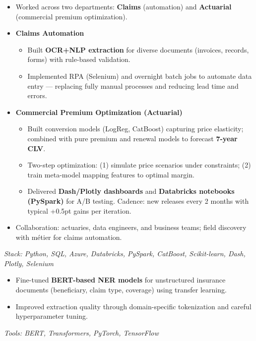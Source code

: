 \documentclass[10pt,a4paper]{altacv}
\begin{document}
\divider

\begin{itemize}
  \item Worked across two departments: \textbf{Claims} (automation) and \textbf{Actuarial} (commercial premium optimization).
  \item \textbf{Claims Automation}
  \begin{itemize}
    \item Built \textbf{OCR+NLP extraction} for diverse documents (invoices, records, forms) with rule-based validation.
    \item Implemented RPA (Selenium) and overnight batch jobs to automate data entry — replacing fully manual processes and reducing lead time and errors.
  \end{itemize}
  \item \textbf{Commercial Premium Optimization (Actuarial)}
  \begin{itemize}
    \item Built conversion models (LogReg, CatBoost) capturing price elasticity; combined with pure premium and renewal models to forecast \textbf{7-year CLV}.
    \item Two-step optimization: (1) simulate price scenarios under constraints; (2) train meta-model mapping features to optimal margin.
    \item Delivered \textbf{Dash/Plotly dashboards} and \textbf{Databricks notebooks (PySpark)} for A/B testing. Cadence: new releases every 2 months with typical +0.5pt gains per iteration.
  \end{itemize}
  \item Collaboration: actuaries, data engineers, and business teams; field discovery with m\'etier for claims automation.
\end{itemize}
\textit{Stack: Python, SQL, Azure, Databricks, PySpark, CatBoost, Scikit-learn, Dash, Plotly, Selenium}

\divider

\begin{itemize}
  \item Fine-tuned \textbf{BERT-based NER models} for unstructured insurance documents (beneficiary, claim type, coverage) using transfer learning.
  \item Improved extraction quality through domain-specific tokenization and careful hyperparameter tuning.
\end{itemize}
\textit{Tools: BERT, Transformers, PyTorch, TensorFlow}
\end{document}
